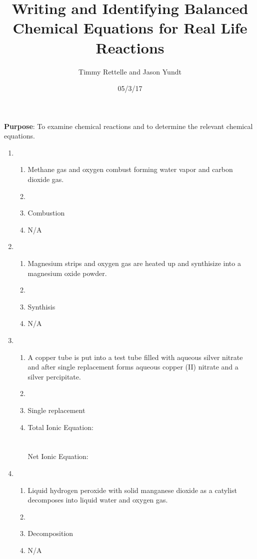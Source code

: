 \documentclass[twoside]{article}
\title{Writing and Identifying Balanced Chemical Equations for Real Life Reactions}
\author{Timmy Rettelle and Jason Yundt}
\date{05/3/17}
\begin{document}
   \maketitle
   \textbf{Purpose}: To examine chemical reactions and to determine the relevant chemical equations.
   \begin{enumerate}[label=\Roman*.]
    
    \item %
    \begin{enumerate}[label=\arabic*.]
     \item Methane gas and oxygen combust forming water vapor and carbon dioxide gas.
     \item {}
     \item Combustion
     \item N/A
    \end{enumerate}
    
    \item %
    \begin{enumerate}[label=\arabic*.]
     \item Magnesium strips and oxygen gas are heated up and synthisize into a magnesium oxide powder.
     \item {}
     \item Synthisis
     \item N/A
    \end{enumerate}
    
    \item %
    \begin{enumerate}[label=\arabic*.]
     \item A copper tube is put into a test tube filled with aqueous silver nitrate and after single replacement forms aqueous copper (II) nitrate and a silver percipitate.
     \item {}
     \item Single replacement
     \item Total Ionic Equation: \\  \\
	   \\
	   Net Ionic Equation: \\ 
    \end{enumerate}
    
    \item %
    \begin{enumerate}[label=\arabic*.]
     \item Liquid hydrogen peroxide with solid manganese dioxide as a catylist decomposes into liquid water and oxygen gas.
     \item {}
     \item Decomposition
     \item N/A
    \end{enumerate}
    

\end{enumerate}
\end{document}
